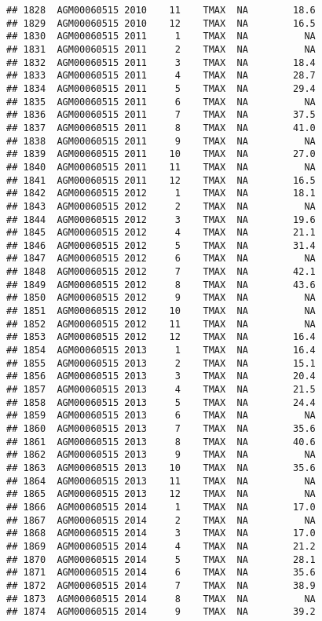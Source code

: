 \documentclass{article}\usepackage[]{graphicx}\usepackage[]{color}
\makeatletter
\newenvironment{kframe}{%
 \def\at@end@of@kframe{}%
 \ifinner\ifhmode%
  \def\at@end@of@kframe{\end{minipage}}%
  \begin{minipage}{\columnwidth}%
 \fi\fi%
 \def\FrameCommand##1{\hskip\@totalleftmargin \hskip-\fboxsep
 \colorbox{shadecolor}{##1}\hskip-\fboxsep
     \hskip-\linewidth \hskip-\@totalleftmargin \hskip\columnwidth}%
 \MakeFramed {\advance\hsize-\width
   \@totalleftmargin\z@ \linewidth\hsize
   \@setminipage}}%
 {\par\unskip\endMakeFramed%
 \at@end@of@kframe}
\newenvironment{knitrout}{}{} %
\makeatother
\begin{document}
\begin{knitrout}
\begin{kframe}
\begin{verbatim}
## 1828  AGM00060515 2010    11    TMAX  NA        18.6
## 1829  AGM00060515 2010    12    TMAX  NA        16.5
## 1830  AGM00060515 2011     1    TMAX  NA          NA
## 1831  AGM00060515 2011     2    TMAX  NA          NA
## 1832  AGM00060515 2011     3    TMAX  NA        18.4
## 1833  AGM00060515 2011     4    TMAX  NA        28.7
## 1834  AGM00060515 2011     5    TMAX  NA        29.4
## 1835  AGM00060515 2011     6    TMAX  NA          NA
## 1836  AGM00060515 2011     7    TMAX  NA        37.5
## 1837  AGM00060515 2011     8    TMAX  NA        41.0
## 1838  AGM00060515 2011     9    TMAX  NA          NA
## 1839  AGM00060515 2011    10    TMAX  NA        27.0
## 1840  AGM00060515 2011    11    TMAX  NA          NA
## 1841  AGM00060515 2011    12    TMAX  NA        16.5
## 1842  AGM00060515 2012     1    TMAX  NA        18.1
## 1843  AGM00060515 2012     2    TMAX  NA          NA
## 1844  AGM00060515 2012     3    TMAX  NA        19.6
## 1845  AGM00060515 2012     4    TMAX  NA        21.1
## 1846  AGM00060515 2012     5    TMAX  NA        31.4
## 1847  AGM00060515 2012     6    TMAX  NA          NA
## 1848  AGM00060515 2012     7    TMAX  NA        42.1
## 1849  AGM00060515 2012     8    TMAX  NA        43.6
## 1850  AGM00060515 2012     9    TMAX  NA          NA
## 1851  AGM00060515 2012    10    TMAX  NA          NA
## 1852  AGM00060515 2012    11    TMAX  NA          NA
## 1853  AGM00060515 2012    12    TMAX  NA        16.4
## 1854  AGM00060515 2013     1    TMAX  NA        16.4
## 1855  AGM00060515 2013     2    TMAX  NA        15.1
## 1856  AGM00060515 2013     3    TMAX  NA        20.4
## 1857  AGM00060515 2013     4    TMAX  NA        21.5
## 1858  AGM00060515 2013     5    TMAX  NA        24.4
## 1859  AGM00060515 2013     6    TMAX  NA          NA
## 1860  AGM00060515 2013     7    TMAX  NA        35.6
## 1861  AGM00060515 2013     8    TMAX  NA        40.6
## 1862  AGM00060515 2013     9    TMAX  NA          NA
## 1863  AGM00060515 2013    10    TMAX  NA        35.6
## 1864  AGM00060515 2013    11    TMAX  NA          NA
## 1865  AGM00060515 2013    12    TMAX  NA          NA
## 1866  AGM00060515 2014     1    TMAX  NA        17.0
## 1867  AGM00060515 2014     2    TMAX  NA          NA
## 1868  AGM00060515 2014     3    TMAX  NA        17.0
## 1869  AGM00060515 2014     4    TMAX  NA        21.2
## 1870  AGM00060515 2014     5    TMAX  NA        28.1
## 1871  AGM00060515 2014     6    TMAX  NA        35.6
## 1872  AGM00060515 2014     7    TMAX  NA        38.9
## 1873  AGM00060515 2014     8    TMAX  NA          NA
## 1874  AGM00060515 2014     9    TMAX  NA        39.2

\end{verbatim}
\end{kframe}
\end{knitrout}
\end{document}
